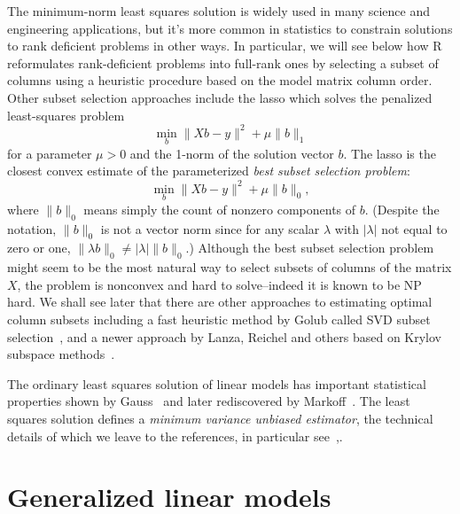 \documentclass[10pt]{article} %
\begin{document}
The minimum-norm least squares solution is widely used in many science and
engineering applications, but it's more common in statistics to constrain
solutions to rank deficient problems in other ways. In particular, we will see
below how R reformulates rank-deficient problems into full-rank ones by
selecting a subset of columns using a heuristic procedure based on the model
matrix column order. Other subset selection approaches include the lasso which
solves the penalized least-squares problem
\begin{equation}\label{lasso}
\min_b\|Xb - y\|^2 + \mu\|b\|_1
\end{equation}
for a parameter $\mu>0$ and the 1-norm of the solution vector $b$. The lasso
is the closest convex estimate of the parameterized
\emph{best subset selection problem}:
\[
\min_b\|Xb - y\|^2 + \mu\|b\|_0,
\]
where $\|b\|_0$ means simply the count of nonzero components of $b$.
(Despite the notation, $\|b\|_0$ is not a vector norm
since for any scalar $\lambda$ with $|\lambda |$ not equal to zero or one,
$\|\lambda b\|_0 \ne |\lambda |\|b\|_0$.) Although the best subset selection
problem might seem to be the most natural way to select subsets of columns of
the matrix $X$, the problem is nonconvex and hard to solve--indeed it is
known to be NP hard.  We
shall see later that there are other approaches to estimating optimal
column subsets including a
fast heuristic method by Golub called SVD subset
selection~\cite[Section 12.2]{gvl}, and a
newer approach by Lanza, Reichel and others based on Krylov subspace
methods~\cite{lanza}.

The ordinary least squares solution of linear models has important statistical
properties shown by Gauss~\cite{gauss} and later rediscovered by
Markoff~\cite{markoff}. The least squares solution defines a {\it minimum
variance unbiased estimator}, the technical details of which we leave to the
references, in particular see~\cite{hastie},\cite{MN}.


\section*{Generalized linear models}
\end{document}
